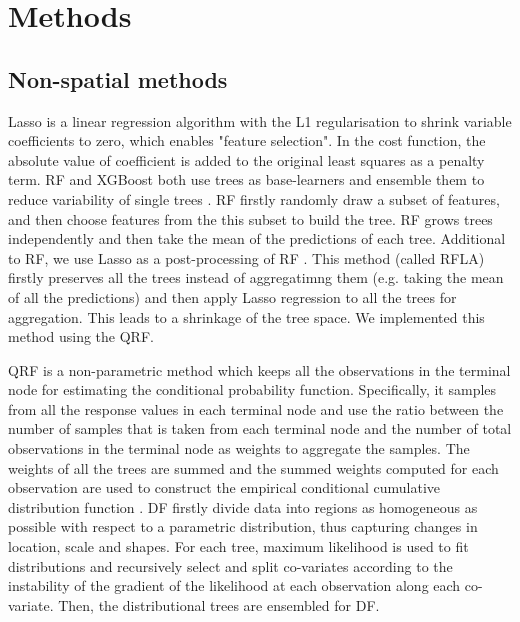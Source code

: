\documentclass{article}
\begin{document}
\section {Methods}

\subsection{Non-spatial methods}
Lasso is a linear regression algorithm with the L1 regularisation to shrink variable coefficients to zero, which enables "feature selection". In the cost function, the absolute value of coefficient is added to the original least squares as a penalty term. RF and XGBoost both use trees as base-learners and ensemble them to reduce variability of single trees \citep{friedman2001greedy}. RF firstly randomly draw a subset of features, and then choose features from the this subset to build the tree. RF \citep{breiman2001random} grows trees independently and then take the mean of the predictions of each tree. Additional to RF, we use Lasso as a post-processing of RF \citep[,][page 617]{hastie2017elements}. This method (called RFLA) firstly preserves all the trees instead of aggregatimng them (e.g. taking the mean of all the predictions) and then apply Lasso regression to all the trees for aggregation. This leads to a shrinkage of the tree space. We implemented this method using the QRF. 

QRF is a non-parametric method which keeps all the observations in the terminal node for estimating the conditional probability function. Specifically, it samples from all the response values in each terminal node and use the ratio between the number of samples that is taken from each terminal node and the number of total observations in the terminal node as weights to aggregate the samples. The weights of all the trees are summed and the summed weights computed for each observation are used to construct the empirical conditional cumulative distribution function \citep{meinshausen2006quantile}. DF \citep{schlosser2019distributional} firstly divide data into regions as homogeneous as possible with respect to a parametric distribution, thus capturing changes in location, scale and shapes. For each tree, maximum likelihood is used to fit distributions and recursively select and split co-variates according to the instability of the gradient of the likelihood at each observation along each co-variate. Then, the distributional trees are ensembled for DF.
\end{document}
